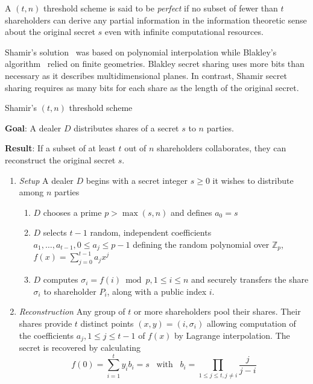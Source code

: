 \begin{defn}
\label{def:threshold_scheme}
 A $\left( t, n \right)$ threshold scheme is said to be \textit{perfect} if no subset of fewer than $t$ shareholders can derive any partial information in the information theoretic sense about the original secret $s$ even with infinite computational resources.
\end{defn}

Shamir's solution~\cite{art:Shamir79} was based on polynomial interpolation while Blakley's algorithm~\cite{art:Blakley79} relied on finite geometries. Blakley secret sharing uses more bits than necessary as it describes multidimensional planes. In contrast, Shamir secret sharing requires as many bits for each share as the length of the original secret.


\begin{algorithm}
\caption{Shamir's $\left( t, n \right)$ threshold scheme~\cite{book:handbook_of_applied_cryptography} }
\label{alg:shamirs_threshold_sheme}
\begin{description}
 \item \textbf{Goal}: A dealer $D$ distributes shares of a secret $s$ to $n$ parties.
 
 \item \textbf{Result}: If a subset of at least $t$ out of $n$ shareholders collaborates, they can reconstruct the original secret $s$.
\end{description}

 \begin{enumerate}
  \item \textit{Setup} A dealer $D$ begins with a secret integer $s \geq 0$ it wishes to distribute among $n$ parties
   \begin{enumerate}
    \item $D$ chooses a prime $p > \max \left( s, n \right)$ and defines $a_0 = s$
    \item $D$ selects $t-1$ random, independent coefficients $a_1, \ldots, a_{t-1}, 0 \leq a_j \leq p-1$ defining the random polynomial over $\mathbb{Z}_p$, $f \left( x \right) = \sum^{t-1}_{j=0} a_j x^j$
    \item $D$ computes $\sigma_i = f \left( i \right) \bmod p, 1 \leq i \leq n$ and securely transfers the share $\sigma_i$ to shareholder $P_i$, along with a public index $i$.
   \end{enumerate}
   \item \textit{Reconstruction} Any group of $t$ or more shareholders pool their shares. Their shares provide $t$ distinct points $\left( x, y \right) = \left( i, \sigma_i \right)$ allowing computation of the coefficients $a_j, 1 \leq j \leq t-1$ of $f \left( x \right)$ by Lagrange interpolation. The secret is recovered by calculating
 \begin{equation*}
  f \left( 0 \right) = \sum^t_{i=1}y_i b_i = s \; \; \; \textrm{with} \; \; \; b_i = \prod_{1 \leq j \leq t, j \neq i} \frac{j}{j-i}
 \end{equation*}
 \end{enumerate}
\end{algorithm}

